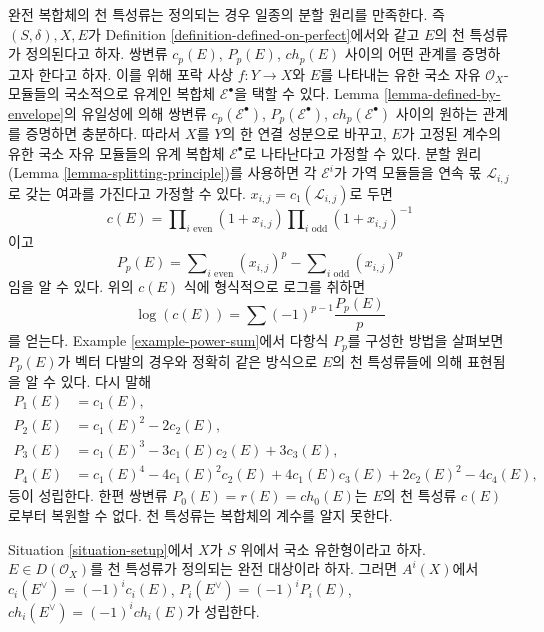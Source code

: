 \begin{remark}
\label{remark-splitting-principle-perfect}
완전 복합체의 천 특성류는 정의되는 경우 일종의 분할 원리를 만족한다.
즉 $(S, \delta), X, E$가 Definition
\ref{definition-defined-on-perfect}에서와 같고 $E$의 천 특성류가
정의된다고 하자. 쌍변류 $c_p(E)$, $P_p(E)$, $ch_p(E)$ 사이의 어떤
관계를 증명하고자 한다고 하자. 이를 위해 포락 사상
$f : Y \to X$와 $E$를 나타내는 유한 국소 자유
$\mathcal{O}_X$-모듈들의 국소적으로 유계인 복합체
$\mathcal{E}^\bullet$을 택할 수 있다. Lemma
\ref{lemma-defined-by-envelope}의 유일성에 의해 쌍변류
$c_p(\mathcal{E}^\bullet)$, $P_p(\mathcal{E}^\bullet)$,
$ch_p(\mathcal{E}^\bullet)$ 사이의 원하는 관계를 증명하면 충분하다.
따라서 $X$를 $Y$의 한 연결 성분으로 바꾸고, $E$가 고정된 계수의
유한 국소 자유 모듈들의 유계 복합체 $\mathcal{E}^\bullet$로
나타난다고 가정할 수 있다. 분할 원리(Lemma
\ref{lemma-splitting-principle})를 사용하면 각
$\mathcal{E}^i$가 가역 모듈들을 연속 몫
$\mathcal{L}_{i, j}$로 갖는 여과를 가진다고 가정할 수 있다.
$x_{i, j} = c_1(\mathcal{L}_{i, j})$로 두면
$$
c(E) =
\prod\nolimits_{i\text{ even}} (1 + x_{i, j})
\prod\nolimits_{i\text{ odd}} (1 + x_{i, j})^{-1}
$$
이고
$$
P_p(E) =  \sum\nolimits_{i\text{ even}} (x_{i, j})^p -
\sum\nolimits_{i\text{ odd}} (x_{i, j})^p
$$
임을 알 수 있다. 위의 $c(E)$ 식에 형식적으로 로그를 취하면
$$
\log(c(E)) = \sum (-1)^{p - 1}\frac{P_p(E)}{p}
$$
를 얻는다. Example \ref{example-power-sum}에서 다항식 $P_p$를 구성한
방법을 살펴보면 $P_p(E)$가 벡터 다발의 경우와 정확히 같은 방식으로
$E$의 천 특성류들에 의해 표현됨을 알 수 있다. 다시 말해
\begin{align*}
P_1(E) & = c_1(E), \\
P_2(E) & = c_1(E)^2 - 2c_2(E), \\
P_3(E) & = c_1(E)^3 - 3c_1(E)c_2(E) + 3c_3(E), \\
P_4(E) & = c_1(E)^4 - 4c_1(E)^2c_2(E) + 4c_1(E)c_3(E) + 2c_2(E)^2 - 4c_4(E),
\end{align*}
등이 성립한다. 한편 쌍변류 $P_0(E) = r(E) = ch_0(E)$는 $E$의 천
특성류 $c(E)$로부터 복원할 수 없다. 천 특성류는 복합체의 계수를
알지 못한다.
\end{remark}

\begin{lemma}
\label{lemma-chern-classes-perfect-dual}
Situation \ref{situation-setup}에서 $X$가 $S$ 위에서 국소 유한형이라고
하자. $E \in D(\mathcal{O}_X)$를 천 특성류가 정의되는 완전 대상이라
하자. 그러면 $A^i(X)$에서 $c_i(E^\vee) = (-1)^i c_i(E)$,
$P_i(E^\vee) = (-1)^iP_i(E)$,
$ch_i(E^\vee) = (-1)^ich_i(E)$가 성립한다.
\end{lemma}


